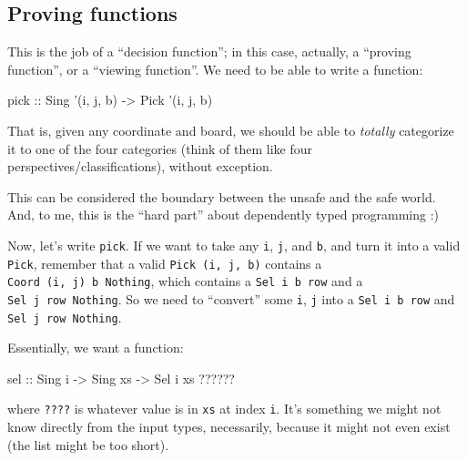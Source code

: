 \documentclass[]{article}
\newenvironment{Shaded}{}{}
\newcommand{\DataTypeTok}[1]{\textcolor[rgb]{0.56,0.13,0.00}{#1}}
\newcommand{\FunctionTok}[1]{\textcolor[rgb]{0.02,0.16,0.49}{#1}}
\newcommand{\NormalTok}[1]{#1}
\newcommand{\OtherTok}[1]{\textcolor[rgb]{0.00,0.44,0.13}{#1}}
\begin{document}
\hypertarget{proving-functions}{%
\subsection{Proving functions}\label{proving-functions}}

This is the job of a ``decision function''; in this case, actually, a ``proving
function'', or a ``viewing function''. We need to be able to write a function:

\begin{Shaded}
\begin{Highlighting}[]
\OtherTok{pick ::} \DataTypeTok{Sing}\NormalTok{ '(i, j, b)}
     \OtherTok{->} \DataTypeTok{Pick}\NormalTok{ '(i, j, b)}
\end{Highlighting}
\end{Shaded}

That is, given any coordinate and board, we should be able to \emph{totally}
categorize it to one of the four categories (think of them like four
perspectives/classifications), without exception.

This can be considered the boundary between the unsafe and the safe world. And,
to me, this is the ``hard part'' about dependently typed programming :)

Now, let's write \texttt{pick}. If we want to take any \texttt{i}, \texttt{j},
and \texttt{b}, and turn it into a valid \texttt{Pick}, remember that a valid
\texttt{Pick\ \textquotesingle{}(i,\ j,\ b)} contains a
\texttt{Coord\ \textquotesingle{}(i,\ j)\ b\ \textquotesingle{}Nothing}, which
contains a \texttt{Sel\ i\ b\ row} and a
\texttt{Sel\ j\ row\ \textquotesingle{}Nothing}. So we need to ``convert'' some
\texttt{i}, \texttt{j} into a \texttt{Sel\ i\ b\ row} and
\texttt{Sel\ j\ row\ \textquotesingle{}Nothing}.

Essentially, we want a function:

\begin{Shaded}
\begin{Highlighting}[]
\OtherTok{sel ::} \DataTypeTok{Sing}\NormalTok{ i}
    \OtherTok{->} \DataTypeTok{Sing}\NormalTok{ xs}
    \OtherTok{->} \DataTypeTok{Sel}\NormalTok{ i xs }\FunctionTok{??????}
\end{Highlighting}
\end{Shaded}

where \texttt{????} is whatever value is in \texttt{xs} at index \texttt{i}.
It's something we might not know directly from the input types, necessarily,
because it might not even exist (the list might be too short).
\end{document}

